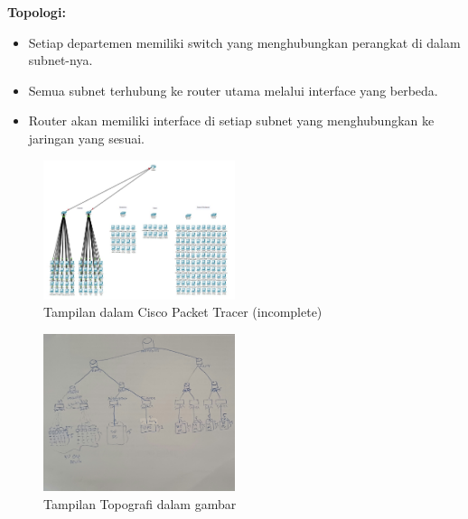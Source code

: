 \begin{enumerate}
	\textbf{Topologi:}
	\begin{itemize}
		\item Setiap departemen memiliki switch yang menghubungkan perangkat di dalam subnet-nya.
		\item Semua subnet terhubung ke router utama melalui interface yang berbeda.
		\item Router akan memiliki interface di setiap subnet yang menghubungkan ke jaringan yang sesuai.
	\end{itemize}
	\begin{figure}[h]
		\centering
		\includegraphics[width=0.5\textwidth]{P1/img/1.jpeg}
		\caption{Tampilan dalam Cisco Packet Tracer (incomplete)}
	\end{figure}
	\begin{figure}[h]
		\centering
		\includegraphics[width=0.5\textwidth]{P1/img/2.jpeg}
		\caption{Tampilan Topografi dalam gambar}
	\end{figure}


\end{enumerate}
